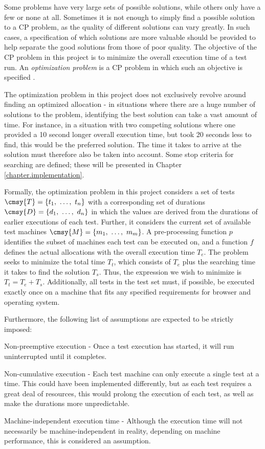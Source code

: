 Some problems have very large sets of possible solutions, while others only have a few or none at all. Sometimes it is not enough to simply find a possible solution to a CP problem, as the quality of different solutions can vary greatly. In such cases, a specification of which solutions are more valuable should be provided to help separate the good solutions from those of poor quality. The objective of the CP problem in this project is to minimize the overall execution time of a test run. An \emph{optimization problem} is a CP problem in which such an objective is specified \cite{MortensBok}.

The optimization problem in this project does not exclusively revolve around finding an optimized allocation - in situations where there are a huge number of solutions to the problem, identifying the best solution can take a vast amount of time. For instance, in a situation with two competing solutions where one provided a 10 second longer overall execution time, but took 20 seconds less to find, this would be the preferred solution. The time it takes to arrive at the solution must therefore also be taken into account. Some stop criteria for searching are defined; these will be presented in Chapter \ref{chapter.implementation}.

Formally, the optimization problem in this project considers a set of tests $\cmsy{T} = \{t_{1},\ \dots,\ t_{n}\}$ with a corresponding set of durations $\cmsy{D} = \{d_{1},\ \dots,\ d_{n}\}$ in which the values are derived from the durations of earlier executions of each test. Further, it considers the current set of available test machines $\cmsy{M} = \{m_{1},\ \dots,\ m_{m}\}$. A pre-processing function $p$ identifies the subset of machines each test can be executed on, and a function $f$ defines the actual allocations with the overall execution time $T_{e}$. The problem seeks to minimize the total time $T_{t}$, which consists of $T_{e}$ plus the searching time it takes to find the solution $T_{s}$. Thus, the expression we wish to minimize is $T_{t} = T_{e} + T_{s}$. Additionally, all tests in the test set must, if possible, be executed exactly once on a machine that fits any specified requirements for browser and operating system.

Furthermore, the following list of assumptions are expected to be strictly imposed:

\begin{Description}
    \item[Non-preemptive execution]- Once a test execution has started, it will run uninterrupted until it completes.
    \item[Non-cumulative execution]- Each test machine can only execute a single test at a time. This could have been implemented differently, but as each test requires a great deal of resources, this would prolong the execution of each test, as well as make the durations more unpredictable.
    \item[Machine-independent execution time]- Although the execution time will not necessarily be machine-independent in reality, depending on machine performance, this is considered an assumption.
\end{Description}

